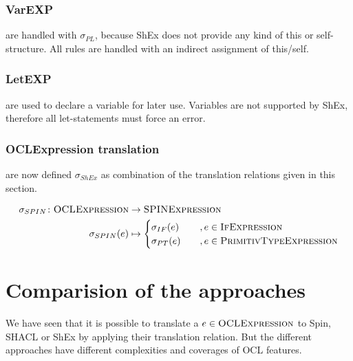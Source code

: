 \documentclass[runningheads]{llncs}
\begin{document}
\subsubsection{VarEXP}
are handled with \(\sigma_{PL}\), because ShEx does not provide any kind of this or self-structure.
All rules are handled with an indirect assignment of this/self.
\subsubsection{LetEXP}
are used to declare a variable for later use.
Variables are not supported by ShEx, therefore all let-statements must force an error.
\subsubsection{OCLExpression translation}
are now defined \(\sigma_{ShEx}\) as combination of the translation relations given in this section.
\begin{definition}
    \begin{align*}
        \sigma_{SPIN}\colon\textsc{OCLExpression} & \to\textsc{SPINExpression} \\
        \sigma_{SPIN}(e)                          & \mapsto
        \begin{cases}
            \sigma_{IF}(e) & \quad , e \in \textsc{IfExpression}           \\
            \sigma_{PT}(e) & \quad , e \in \textsc{PrimitivTypeExpression}
        \end{cases}
    \end{align*}
    \label{OCLtoShEx}
\end{definition}
\section{Comparision of the approaches}
We have seen that it is possible to translate a \(e\in\textsc{OCLExpression}\) to Spin, SHACL or ShEx by applying their translation relation.
But the different approaches have different complexities and coverages of OCL features.
\end{document}
